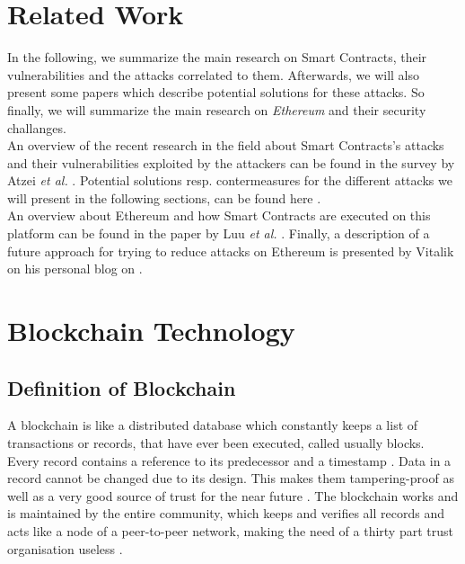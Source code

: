 \section{Related Work}
In the following, we summarize the main research on Smart Contracts, their  vulnerabilities and the attacks correlated to them. Afterwards, we will also present some papers which describe potential solutions for these attacks. So finally, we will summarize the main research on \textit{Ethereum} and their security challanges. \\
An overview of the recent research in the field about Smart Contracts's attacks and their vulnerabilities exploited by the attackers can be found in the survey by Atzei \textit{et al.} \cite{paper2}. Potential solutions resp. contermeasures for the different attacks we will present in the following sections, can be found here \cite{ paper2, ok, hardfork, timmedCommitments1, koetXD}. \\
An overview about Ethereum and how Smart Contracts are executed on this platform can be found in the paper by Luu \textit{et al.} \cite{paper1}. Finally, a description of a future approach for trying to reduce attacks on Ethereum is presented by Vitalik on his personal blog on \cite{challenge2, challenge3}. 



\section{Blockchain Technology}
\subsection{Definition of Blockchain}
A blockchain is like a distributed database which constantly keeps a list of transactions or records, that have ever been executed, called usually blocks. Every record contains a reference to its predecessor and a timestamp \cite{wikipedia1}.
Data in a record cannot be changed due to its design. This makes them tampering-proof as well as a very good source of trust for the near future \cite{blockchain3}.
The blockchain works and is maintained by the entire community, which keeps and verifies all records and acts like a node of a peer-to-peer network, making the need of a thirty part trust organisation useless \cite{blockchain0}.
